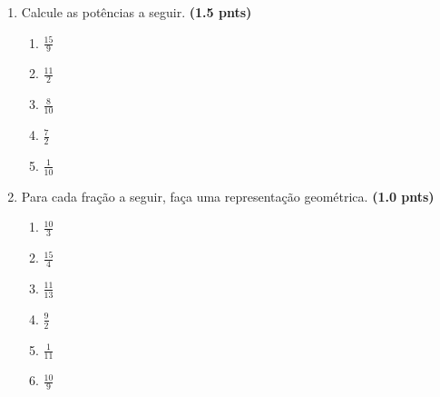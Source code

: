 \documentclass{article}
\begin{document}
\begin{enumerate}
	\item Calcule as potências a seguir. \textbf{(1.5 pnts)}

		\begin{enumerate}
			\item $\frac{15}{9}$
			\item $\frac{11}{2}$
			\item $\frac{8}{10}$
			\item $\frac{7}{2}$
			\item $\frac{1}{10}$
		\end{enumerate}

	\item Para cada fração a seguir, faça uma representação geométrica. \textbf{(1.0 pnts)}

		\begin{enumerate}
			\item $\frac{10}{3}$
			\item $\frac{15}{4}$
			\item $\frac{11}{13}$
			\item $\frac{9}{2}$
			\item $\frac{1}{11}$
			\item $\frac{10}{9}$
		\end{enumerate}

\end{enumerate}
\end{document}
